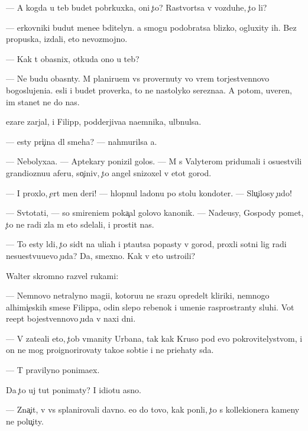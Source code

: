\documentclass[10pt]{book}
\begin{document}
— A kogda u teb{\ia} budet pobr{\ia}kuxka, oni {\c}to? Rastvor{\ia}tsa v vozduhe, {\c}to li?

— {\Q}erkovniki budut mene{\y}e bditelyn{\yi}. {\Y}a smogu podobratsa blizko, ogluxity ih. Bez propuska, izdali, eto nevozmojno.

— Kak t{\yi} ob{\y}asnix, otkuda ono u teb{\ia}?

— Ne budu ob{\y}asn{\ia}ty. M{\yi} planiru{\y}em vs{\e} provernuty vo vrem{\ia} torjestvennovo bogoslujeni{\y}a. {\Y}esli i budet proverka, to ne nastolyko ser{\y}ezna{\y}a. A potom, uveren, im stanet ne do nas.

{\C}ezare zarjal, i Filipp, podderjiva{\y}a na{\y}emnika, ul{\yi}bnulsa.

— {\Y}esty pri{\c}ina dl{\ia} smeha? — nahmurilsa {\y}a.

— Nebolyxa{\y}a. — Aptekary ponizil golos. — M{\yi} s Valyterom pridumali i osu{\x}estvili grandioznu{\y}u aferu, so{\c}iniv, {\c}to angel snizoxel v etot gorod.

— I proxlo, {\c}ert men{\ia} deri! — hlopnul ladon{\y}u po stolu kondot{\y}er. — Slu{\c}ilosy {\c}udo!

— Sv{\ia}totat{\q}i, — so smireni{\y}em poka{\c}al golovo{\y} kanonik. — Nade{\y}usy, Gospody po{\y}met, {\c}to ne radi zla m{\yi} eto sdelali, i prostit nas.

— To {\y}esty l{\iu}di, {\c}to sid{\ia}t na uli{\q}ah i p{\yi}ta{\y}utsa popasty v gorod, proxli sotni lig radi nesu{\x}estvu{\y}u{\x}evo {\c}uda? Da, smexno. Kak v{\yi} eto ustro{\y}ili?

Walter skromno razvel rukami:

— Nemnovo ne{\y}tralyno{\y} magi{\y}i, kotoru{\y}u ne srazu opredel{\ia}t kliriki, nemnogo alhimi{\c}eskih smese{\y} Filippa, odin slepo{\y} rebenok i umeni{\y}e rasprostran{\ia}ty sluhi. Vot re{\q}ept bojestvennovo {\c}uda v naxi dni.

— V{\yi} zate{\y}ali eto, {\c}tob{\yi} v{\yi}manity Urbana, tak kak Kruso pod {\y}evo pokrovitelystvom, i on ne mog proignorirovaty tako{\y}e sob{\yi}ti{\y}e i ne pri{\y}ehaty s{\iu}da.

— T{\yi} pravilyno ponima{\y}ex.

Da {\c}to uj tut ponimaty? I idiotu {\y}asno.

— Zna{\c}it, v{\yi} vs{\e} splanirovali davno. {\y}e{\x}o do tovo, kak pon{\ia}li, {\c}to s kollek{\q}ionera kameny ne polu{\c}ity.
\end{document}
